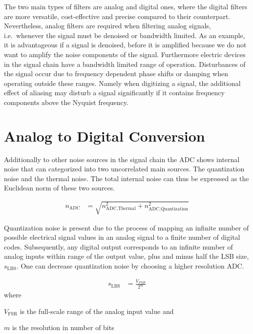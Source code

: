 The two main types of filters are analog and digital ones, where the digital filters are more versatile, cost-effective and precise compared to their counterpart. Nevertheless, analog filters are required when filtering analog signals, i.e.\ whenever the signal must be denoised or bandwidth limited. As an example, it is advantageous if a signal is denoised, before it is amplified because we do not want to amplify the noise components of the signal. Furthermore electric devices in the signal chain have a bandwidth limited range of operation. Disturbances of the signal occur due to frequency dependent phase shifts or damping when operating outside these ranges. Namely when digitizing a signal, the additional effect of aliasing may disturb a signal significantly if it contains frequency components above the Nyquist frequency.

\section{Analog to Digital Conversion}

Additionally to other noise sources in the signal chain the \ac{ADC} shows internal noise that can categorized into two uncorrelated main sources. The quantization noise and the thermal noise. The total internal noise can thus be expressed as the Euclidean norm of these two sources.

\begin{align}
  n_\text{ADC} &= \sqrt{n_{\text{ADC},\text{Thermal}}^2 + n_{\text{ADC},\text{Quantization}}^2}
\end{align}

Quantization noise is present due to the process of mapping an infinite number of possible electrical signal values in an analog signal to a finite number of digital codes. Subsequently, any digital output corresponds to an infinite number of analog inputs within range of the output value, plus and minus half the \ac{LSB} size, $s_\text{LBS}$. One can decrease quantization noise by choosing a higher resolution \ac{ADC}.

\begin{align}
  s_\text{LBS} &= \frac{V_{FSR}}{2^m}
\end{align}
where
\begin{description}[topsep=0ex, noitemsep]
  \item $V_{\text{FSR}}$ is the full-scale range of the analog input value and
  \item $m$ is the resolution in number of bits
\end{description}

